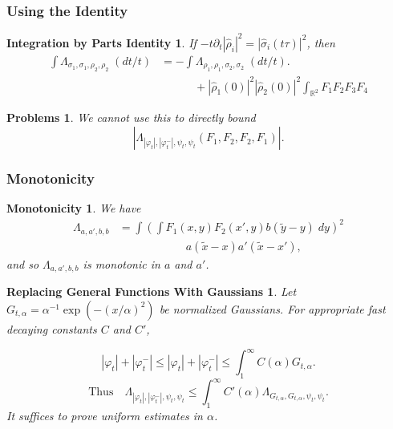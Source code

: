 \documentclass[usenames,dvipsnames,12pt]{beamer}
\DeclareMathOperator{\RR}{\mathbb{R}}
\newtheorem*{ibpidentity}{Integration by Parts Identity}
\newtheorem*{problems}{Problems}
\newtheorem*{monotonicity}{Monotonicity}
\newtheorem*{replacingfunctionswithgaussians}{Replacing General Functions With Gaussians}
\begin{document}
\begin{frame}
    \frametitle{Using the Identity}

    \begin{ibpidentity}
        If $-t \partial_t | \widehat{\rho}_i |^2 = |\widehat{\sigma}_i(t \tau)|^2$, then
        \begin{align*}
            \int \Lambda_{\sigma_1, \sigma_1, \rho_2, \rho_2}\; (dt / t) &= - \int \Lambda_{\rho_1, \rho_1, \sigma_2, \sigma_2}\; (dt / t).\\
            &\quad\quad\quad + |\widehat{\rho}_1(0)|^2 |\widehat{\rho}_2(0)|^2 \int_{\RR^2} F_1 F_2 F_3 F_4
        \end{align*}
    \end{ibpidentity}

    \begin{problems}
        We cannot use this to directly bound
        \vspace{-0.7em}
        \[ |\Lambda_{|\varphi_t|, |\varphi_t^-|, \psi_t, \psi_t}(F_1,F_2,F_2,F_1)|. \]
    \end{problems}
\end{frame}

\begin{frame}
    \frametitle{Monotonicity}

    \begin{monotonicity}

    We have
    \vspace{-0.8em}
    \begin{align*}
        \Lambda_{a,a',b,b} &= \int \left( \int F_1(x,y) F_2(x',y) b(\tilde{y} - y)\; dy \right)^2\\
        &\quad\quad\quad\quad\quad\quad a(\tilde{x} - x) a'(\tilde{x} - x'),
    \end{align*}
    and so $\Lambda_{a,a',b,b}$ is  \emph{monotonic} in $a$ and $a'$.

    \end{monotonicity}

    \pause

    \begin{replacingfunctionswithgaussians}
    Let $G_{t,\alpha} = \alpha^{-1} \exp(-(x/\alpha)^2)$ be normalized Gaussians. For appropriate fast decaying constants $C$ and $C'$,
    \small

    \vspace{-1em}
    \[ |\varphi_t| + |\varphi_t^-| \leq |\varphi_t| + |\varphi_t^-| \leq \int_1^\infty C(\alpha) G_{t,\alpha}. \]
    \vspace{-1.2em}
    \[ \text{Thus}\quad \Lambda_{|\varphi_t|,|\varphi_t^-|,\psi_t, \psi_t} \leq \int_1^\infty C'(\alpha) \Lambda_{G_{t,\alpha}, G_{t,\alpha}, \psi_t, \psi_t}. \]
    It suffices to prove uniform estimates in $\alpha$.
    \end{replacingfunctionswithgaussians}
\end{frame}
\end{document}
